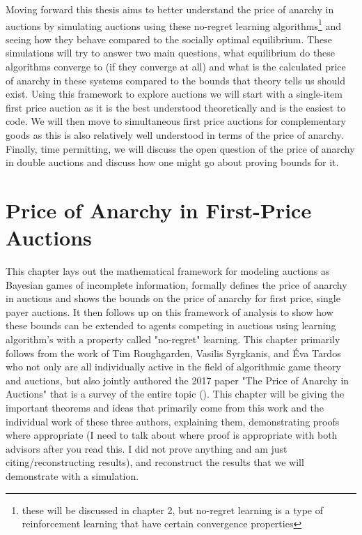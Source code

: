 \documentclass[12pt,twoside]{reedthesis}
\begin{document}
Moving forward this thesis aims to better understand the price of anarchy in auctions by simulating auctions using these no-regret learning algorithms\footnote{these will be discussed in chapter 2, but no-regret learning is a type of reinforcement learning that have certain convergence properties} and seeing how they behave compared to the socially optimal equilibrium. These simulations will try to answer two main questions, what equilibrium do these algorithms converge to (if they converge at all) and what is the calculated price of anarchy in these systems compared to the bounds that theory tells us should exist. Using this framework to explore auctions we will start with a single-item first price auction as it is the best understood theoretically and is the easiest to code. We will then move to simultaneous first price auctions for complementary goods as this is also relatively well understood in terms of the price of anarchy. Finally, time permitting, we will discuss the open question of the price of anarchy in double auctions and discuss how one might go about proving bounds for it.

\chapter{Price of Anarchy in First-Price Auctions}
This chapter lays out the mathematical framework for modeling auctions as Bayesian games of incomplete information, formally defines the price of anarchy in auctions and shows the bounds on the price of anarchy for first price, single payer auctions. It then follows up on this framework of analysis to show how these bounds can be extended to agents competing in auctions using learning algorithm's with a property called "no-regret" learning. This chapter primarily follows from the work of Tim Roughgarden, Vasilis Syrgkanis, and \'Eva Tardos who not only are all individually active in the field of algorithmic game theory and auctions, but also jointly authored the 2017 paper "The Price of Anarchy in Auctions" that is a survey of the entire topic (\cite{Roughgarden2017}). This chapter will be giving the important theorems and ideas that primarily come from this work and the individual work of these three authors, explaining them, demonstrating proofs where appropriate (I need to talk about where proof is appropriate with both advisors after you read this. I did not prove anything and am just citing/reconstructing results), and reconstruct the results that we will demonstrate with a simulation.   
\end{document}
